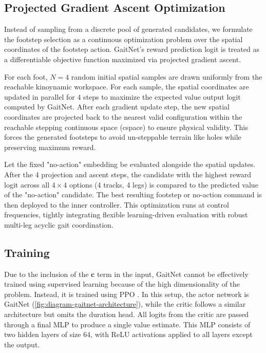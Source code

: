 \subsection{Projected Gradient Ascent Optimization}
\label{subsec:methodology-gaitnet-gradient-ascent}

Instead of sampling from a discrete pool of generated candidates, we formulate
the footstep selection as a continuous optimization problem over the spatial
coordinates of the footstep action. GaitNet's reward prediction logit is treated
as a differentiable objective function maximized via projected gradient ascent.

For each foot, $N=4$ random initial spatial samples are drawn uniformly from the
reachable kinoynamic workspace. For each sample, the spatial
coordinates are updated
in parallel for 4 steps to maximize the expected value output logit
computed by GaitNet.
After each gradient update step, the new spatial coordinates are
projected back to the
nearest valid configuration within the reachable stepping continuous
space (cspace)
to ensure physical validity. This forces the generated footsteps to
avoid un-steppable
terrain like holes while preserving maximum reward.

Let the fixed "no-action" embedding be evaluated alongside the spatial updates.
After the 4 projection and ascent steps, the candidate with the highest reward
logit across all $4 \times 4$ options (4 tracks, 4 legs) is compared to the
predicted value of the "no-action" candidate. The best resulting footstep or
no-action command is then deployed to the inner controller. This
optimization runs
at control frequencies, tightly integrating flexible learning-driven evaluation
with robust multi-leg acyclic gait coordination.

\subsection{Training}
\label{subsec:methodology-gaitnet-training}

Due to the inclusion of the $\mathbf{c}$ term in the input, GaitNet
cannot be effectively trained using supervised learning because of
the high dimensionality of the problem. Instead, it is trained using
PPO \cite{Schulman_proximal_2017}. In this setup, the actor network
is GaitNet (\autoref{fig:diagram-gaitnet-architecture}), while the
critic follows a similar architecture but omits the duration head.
All logits from the critic are passed through a final MLP to produce
a single value estimate. This MLP consists of two hidden layers of
size 64, with ReLU activations applied to all layers except the output.

